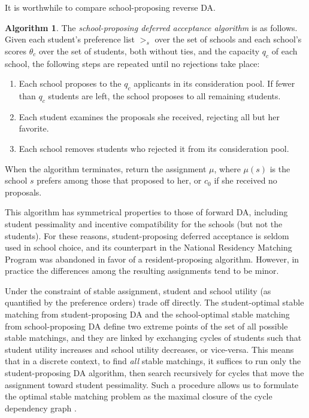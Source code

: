\documentclass[12pt]{article}
\theoremstyle{definition}
\newtheorem{algorithm}{Algorithm}
\begin{document}
It is worthwhile to compare school-proposing reverse DA. 
\begin{algorithm}
The \emph{school-proposing deferred acceptance algorithm} is as follows. Given each student's preference list $>_s$ over the set of schools and each school's scores $\theta_c$ over the set of students, both without ties, and the capacity $q_c$ of each school, the following steps are repeated until no rejections take place:
\begin{enumerate}
\item Each school proposes to the $q_c$ applicants in its consideration pool. If fewer than $q_c$ students are left, the school proposes to all remaining students.
\item Each student examines the proposals she received, rejecting all but her favorite.
\item Each school removes students who rejected it from its consideration pool.
\end{enumerate}
When the algorithm terminates, return the assignment $\mu$, where $\mu(s)$ is the school $s$ prefers among those that proposed to her, or $c_0$ if she received no proposals.
\end{algorithm}
This algorithm has symmetrical properties to those of forward DA, including student pessimality and incentive compatibility for the schools (but not the students).  For these reasons, student-proposing deferred acceptance is seldom used in school choice, and its counterpart in the National Residency Matching Program was abandoned in favor of a resident-proposing algorithm. However, in practice the differences among the resulting assignments tend to be minor. %

Under the constraint of stable assignment, student and school utility (as quantified by the preference orders) trade off directly. The student-optimal stable matching from student-proposing DA and the school-optimal stable matching from school-proposing DA define two extreme points of the set of all possible stable matchings, and they are linked by exchanging cycles of students such that student utility increases and school utility decreases, or vice-versa. This means that in a discrete context, to find \emph{all} stable matchings, it suffices to run only the student-proposing DA algorithm, then search recursively for cycles that move the assignment toward student pessimality. Such a procedure allows us to formulate the optimal stable matching problem as the maximal closure of the cycle dependency graph \parencite[][]{efficientalgorithmoptimal}. 
\end{document}
